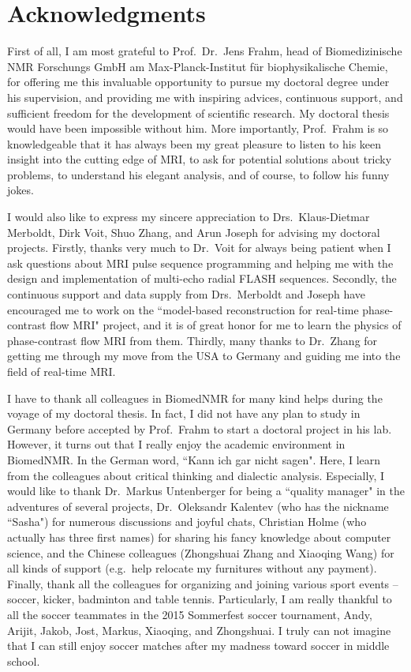 \chapter*{Acknowledgments}

First of all, I am most grateful to Prof.~Dr.~Jens Frahm, head of Biomedizinische NMR Forschungs GmbH am Max-Planck-Institut f\"{u}r biophysikalische Chemie, for offering me this invaluable opportunity to pursue my doctoral degree under his supervision, and providing me with inspiring advices, continuous support, and sufficient freedom for the development of scientific research. My doctoral thesis would have been impossible without him. More importantly, Prof.~Frahm is so knowledgeable that it has always been my great pleasure to listen to his keen insight into the cutting edge of MRI, to ask for potential solutions about tricky problems, to understand his elegant analysis, and of course, to follow his funny jokes.

I would also like to express my sincere appreciation to Drs.~Klaus-Dietmar Merboldt, Dirk Voit, Shuo Zhang, and Arun Joseph for advising my doctoral projects. Firstly, thanks very much to Dr.~Voit for always being patient when I ask questions about MRI pulse sequence programming and helping me with the design and implementation of multi-echo radial FLASH sequences. Secondly, the continuous support and data supply from Drs.~Merboldt and Joseph have encouraged me to work on the ``model-based reconstruction for real-time phase-contrast flow MRI" project, and it is of great honor for me to learn the physics of phase-contrast flow MRI from them. Thirdly, many thanks to Dr.~Zhang for getting me through my move from the USA to Germany and guiding me into the field of real-time MRI.

I have to thank all colleagues in BiomedNMR for many kind helps during the voyage of my doctoral thesis. In fact, I did not have any plan to study in Germany before accepted by Prof.~Frahm to start a doctoral project in his lab. However, it turns out that I really enjoy the academic environment in BiomedNMR. In the German word, ``Kann ich gar nicht sagen". Here, I learn from the colleagues about critical thinking and dialectic analysis. Especially, I would like to thank Dr.~Markus Untenberger for being a ``quality manager" in the adventures of several projects, Dr.~Oleksandr Kalentev (who has the nickname ``Sasha") for numerous discussions and joyful chats, Christian Holme (who actually has three first names) for sharing his fancy knowledge about computer science, and the Chinese colleagues (Zhongshuai Zhang and Xiaoqing Wang) for all kinds of support (e.g.~help relocate my furnitures without any payment). Finally, thank all the colleagues for organizing and joining various sport events -- soccer, kicker, badminton and table tennis. Particularly, I am really thankful to all the soccer teammates in the 2015 Sommerfest soccer tournament, Andy, Arijit, Jakob, Jost, Markus, Xiaoqing, and Zhongshuai. I truly can not imagine that I can still enjoy soccer matches after my madness toward soccer in middle school.

